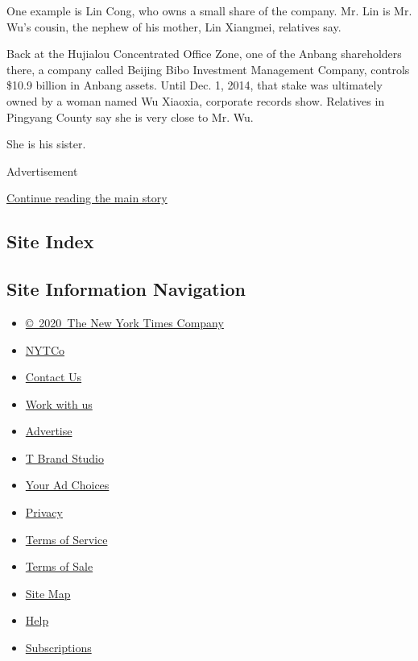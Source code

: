 One example is Lin Cong, who owns a small share of the company. Mr. Lin
is Mr. Wu's cousin, the nephew of his mother, Lin Xiangmei, relatives
say.

Back at the Hujialou Concentrated Office Zone, one of the Anbang
shareholders there, a company called Beijing Bibo Investment Management
Company, controls \$10.9 billion in Anbang assets. Until Dec. 1, 2014,
that stake was ultimately owned by a woman named Wu Xiaoxia, corporate
records show. Relatives in Pingyang County say she is very close to Mr.
Wu.

She is his sister.

Advertisement

\protect\hyperlink{after-bottom}{Continue reading the main story}

\hypertarget{site-index}{%
\subsection{Site Index}\label{site-index}}

\hypertarget{site-information-navigation}{%
\subsection{Site Information
Navigation}\label{site-information-navigation}}

\begin{itemize}
\tightlist
\item
  \href{https://help.nytimes.com/hc/en-us/articles/115014792127-Copyright-notice}{©~2020~The
  New York Times Company}
\end{itemize}

\begin{itemize}
\tightlist
\item
  \href{https://www.nytco.com/}{NYTCo}
\item
  \href{https://help.nytimes.com/hc/en-us/articles/115015385887-Contact-Us}{Contact
  Us}
\item
  \href{https://www.nytco.com/careers/}{Work with us}
\item
  \href{https://nytmediakit.com/}{Advertise}
\item
  \href{http://www.tbrandstudio.com/}{T Brand Studio}
\item
  \href{https://www.nytimes.com/privacy/cookie-policy\#how-do-i-manage-trackers}{Your
  Ad Choices}
\item
  \href{https://www.nytimes.com/privacy}{Privacy}
\item
  \href{https://help.nytimes.com/hc/en-us/articles/115014893428-Terms-of-service}{Terms
  of Service}
\item
  \href{https://help.nytimes.com/hc/en-us/articles/115014893968-Terms-of-sale}{Terms
  of Sale}
\item
  \href{https://spiderbites.nytimes.com}{Site Map}
\item
  \href{https://help.nytimes.com/hc/en-us}{Help}
\item
  \href{https://www.nytimes.com/subscription?campaignId=37WXW}{Subscriptions}
\end{itemize}
